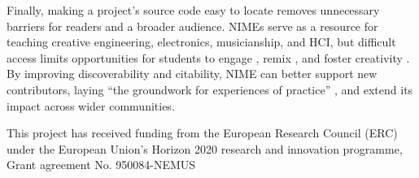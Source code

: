 Finally, making a project’s source code easy to locate removes unnecessary barriers for readers and a broader audience. 
NIMEs serve as a resource for teaching creative engineering, electronics, musicianship, and HCI, but difficult access limits opportunities for students to engage \cite{nime2021_26}, remix \cite{dasgupta_remixing_2016}, and foster creativity \cite{sharmin_creativity_2021, marin_computational_2024}. 
By improving discoverability and citability, NIME can better support new contributors, laying ``the groundwork for experiences of practice'' \cite[p. 277]{sennett_craftsman_2008}, and extend its impact across wider communities.

\begin{acks}
This project has received funding from the European Research Council (ERC) under the European Union’s Horizon 2020 research and innovation programme, Grant agreement No. 950084-NEMUS
\end{acks}